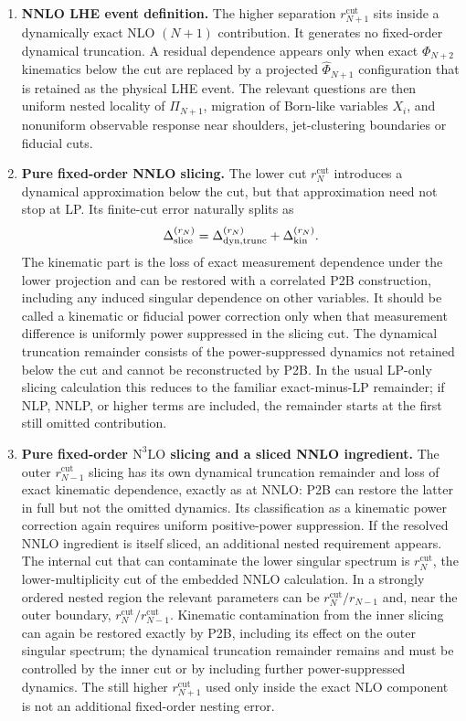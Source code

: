 \documentclass[11pt]{article}
\newcommand{\rnm}{r_{N-1}}
\newcommand{\rn}{r_N}
\newcommand{\rnp}{r_{N+1}}
\newcommand{\cut}{\mathrm{cut}}
\newcommand{\Ph}{\Phi}
\begin{document}
\begin{enumerate}
\item \textbf{NNLO LHE event definition.}
The higher separation $\rnp^{\cut}$ sits inside a dynamically exact NLO $(N+1)$ contribution. It generates
no fixed-order dynamical truncation. A residual dependence appears only when exact $\Ph_{N+2}$ kinematics
below the cut are replaced by a projected $\widehat\Ph_{N+1}$ configuration that is retained as the physical
LHE event. The relevant questions are then uniform nested locality of $\Pi_{N+1}$, migration of Born-like
variables $X_i$, and nonuniform observable response near shoulders, jet-clustering boundaries or fiducial cuts.

\item \textbf{Pure fixed-order NNLO slicing.}
The lower cut $\rn^{\cut}$ introduces a dynamical approximation below the cut, but that approximation need
not stop at LP. Its finite-cut error naturally splits as
\[
\Delta_{\rm slice}^{(\rn)}
=
\Delta_{\rm dyn,trunc}^{(\rn)}+
\Delta_{\rm kin}^{(\rn)}.
\]
The kinematic part is the loss of exact measurement dependence under the lower projection and can be restored
with a correlated P2B construction, including any induced singular dependence on other variables. It should
be called a kinematic or fiducial power correction only when that measurement difference is uniformly
power suppressed in the slicing cut. The dynamical truncation remainder consists of the power-suppressed
dynamics not retained below the cut and cannot be reconstructed by P2B. In the usual LP-only slicing
calculation this reduces to the familiar exact-minus-LP remainder; if NLP, NNLP, or higher terms are included,
the remainder starts at the first still omitted contribution.

\item \textbf{Pure fixed-order $\mathrm{N}^3\mathrm{LO}$ slicing and a sliced NNLO ingredient.}
The outer $\rnm^{\cut}$ slicing has its own dynamical truncation remainder and loss of exact kinematic
dependence, exactly as at NNLO: P2B can restore the latter in full but not the omitted dynamics. Its
classification as a kinematic power correction again requires uniform positive-power suppression. If the resolved
NNLO ingredient is itself sliced, an additional nested requirement appears. The internal cut that can
contaminate the lower singular spectrum is $\rn^{\cut}$, the lower-multiplicity cut of the embedded NNLO
calculation. In a strongly ordered nested region the relevant parameters can be $\rn^{\cut}/\rnm$ and, near
the outer boundary, $\rn^{\cut}/\rnm^{\cut}$. Kinematic contamination from the inner slicing can again be
restored exactly by P2B, including its effect on the outer singular spectrum; the dynamical truncation
remainder remains and must be controlled by the inner cut or by
including further power-suppressed dynamics. The still higher $\rnp^{\cut}$ used only inside the exact NLO
component is not an additional fixed-order nesting error.
\end{enumerate}
\end{document}
